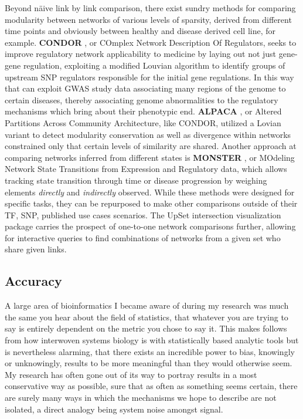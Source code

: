 Beyond n{\"a}ive link by link comparison, there exist sundry methods for comparing modularity between networks of various levels of sparsity, derived from different time points and obviously between healthy and disease derived cell line, for example. \textbf{CONDOR} \cite{platig2016bipartite}, or COmplex Network Description Of Regulators, seeks to improve regulatory network applicability to medicine by laying out not just gene-gene regulation, exploiting a modified Louvian algorithm to identify groups of upstream SNP regulators responsible for the initial gene regulations. In this way that can exploit GWAS study data associating many regions of the genome to certain diseases, thereby associating genome abnormalities to the regulatory mechanisms which bring about their phenotypic end. \textbf{ALPACA} \cite{padi2018detecting}, or Altered Partitions Across Community Architecture, like CONDOR,  utilized a Lovian variant to detect modularity conservation as well as divergence within networks constrained only that certain levels of similarity are shared. Another approach at comparing networks inferred from different states is \textbf{MONSTER} \cite{schlauch2017estimating}, or MOdeling Network State Transitions from Expression and Regulatory data, which allows tracking state transition through time or disease progression by weighing elements \emph{directly} and \emph{indirectly} observed. While these methods were designed for specific tasks, they can be repurposed to make other comparisons outside of their TF, SNP, \etc published use cases scenarios. The UpSet \cite{lex2014upset} intersection visualization package carries the prospect of one-to-one network comparisons further, allowing for interactive queries to find combinations of networks from a given set who share given links.

\subsection{Accuracy}
\label{sec:acc}

A large area of bioinformatics I became aware of during my research was much the same you hear about the field of statistics, that whatever you are trying to say is entirely dependent on the metric you chose to say it. This makes follows from how interwoven systems biology is with statistically based analytic tools but is nevertheless alarming, that there exists an incredible power to bias, knowingly or unknowingly, results to be more meaningful than they would otherwise seem. My research has often gone out of its way to portray results in a most conservative way as possible, sure that as often as something seems certain, there are surely many ways in which the mechanisms we hope to describe are not isolated, a direct analogy being system noise amongst signal.

